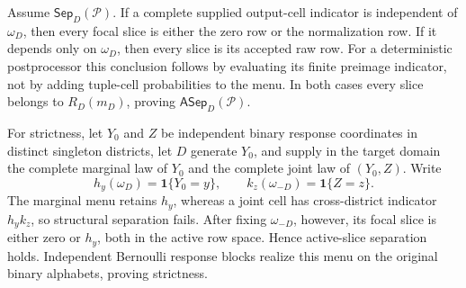 Assume \(\mathsf{Sep}_D(\mathcal P)\).  If a complete supplied output-cell indicator is independent of \(\omega_D\), then every focal slice is either the zero row or the normalization row.  If it depends only on \(\omega_D\), then every slice is its accepted raw row.  For a deterministic postprocessor this conclusion follows by evaluating its finite preimage indicator, not by adding tuple-cell probabilities to the menu.  In both cases every slice belongs to \(R_D(m_D)\), proving \(\mathsf{ASep}_D(\mathcal P)\).

For strictness, let \(Y_0\) and \(Z\) be independent binary response coordinates in distinct singleton districts, let \(D\) generate \(Y_0\), and supply in the target domain the complete marginal law of \(Y_0\) and the complete joint law of \((Y_0,Z)\).  Write
\[
h_y(\omega_D)=\mathbf 1\{Y_0=y\},
\qquad
k_z(\omega_{-D})=\mathbf 1\{Z=z\}.
\]
The marginal menu retains \(h_y\), whereas a joint cell has cross-district indicator \(h_yk_z\), so structural separation fails.  After fixing \(\omega_{-D}\), however, its focal slice is either zero or \(h_y\), both in the active row space.  Hence active-slice separation holds.  Independent Bernoulli response blocks realize this menu on the original binary alphabets, proving strictness.